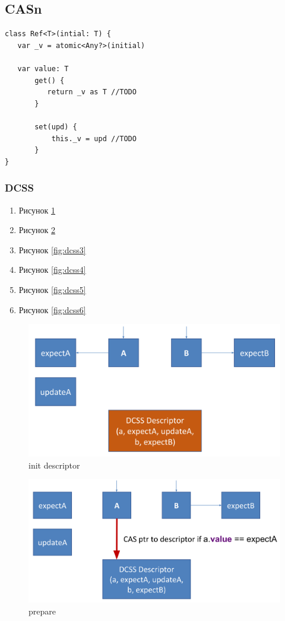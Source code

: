 \documentclass[10pt,a4paper,oneside,titlepage]{article}
\theoremstyle{plain}
\theoremstyle{defenition}
\begin{document}
\subsection{CASn}

\begin{lstlisting}
class Ref<T>(intial: T) {
   var _v = atomic<Any?>(initial)
   
   var value: T
       get() {
          return _v as T //TODO
       }
       
       set(upd) {
           this._v = upd //TODO
       }
}
\end{lstlisting}

\subsubsection{DCSS}

\begin{enumerate}
	\item Рисунок \ref{fig:dcss1}
    \item Рисунок \ref{fig:dcss2}
    \item Рисунок \ref{fig:dcss3}
    \item Рисунок \ref{fig:dcss4}
    \item Рисунок \ref{fig:dcss5}
    \item Рисунок \ref{fig:dcss6}
\end{enumerate}

\begin{figure}[h!]
	\centering
	\includegraphics[width=0.4\linewidth]{pictures/DCSS1}
	\caption{init descriptor}
	\label{fig:dcss1}
\end{figure}

\begin{figure}[h!]
	\centering
	\includegraphics[width=0.4\linewidth]{pictures/DCSS2}
	\caption{prepare}
	\label{fig:dcss2}
\end{figure}
\end{document}
